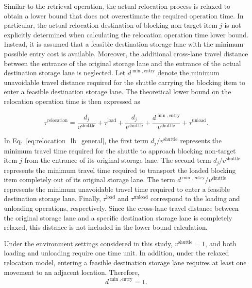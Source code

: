 Similar to the retrieval operation, the actual relocation process is relaxed to obtain a lower bound that does not overestimate the required operation time. In particular, the actual relocation destination of blocking non-target item \(j\) is not explicitly determined when calculating the relocation operation time lower bound. Instead, it is assumed that a feasible destination storage lane with the minimum possible entry cost is available. Moreover, the additional cross-lane travel distance between the entrance of the original storage lane and the entrance of the actual destination storage lane is neglected. Let \(d^{\min,\mathrm{entry}}\) denote the minimum unavoidable travel distance required for the shuttle carrying the blocking item to enter a feasible destination storage lane. The theoretical lower bound on the relocation operation time is then expressed as

\begin{equation}
\tau^{\mathrm{relocation}}
=
\frac{d_j}{v^{\mathrm{shuttle}}}
+
\tau^{\mathrm{load}}
+
\frac{d_j}{v^{\mathrm{shuttle}}}
+
\frac{d^{\min,\mathrm{entry}}}{v^{\mathrm{shuttle}}}
+
\tau^{\mathrm{unload}}.
\label{eq:relocation_lb_general}
\end{equation}

In Eq.~\eqref{eq:relocation_lb_general}, the first term \(d_j/v^{\mathrm{shuttle}}\) represents the minimum travel time required for the shuttle to approach blocking non-target item \(j\) from the entrance of its original storage lane. The second term \(d_j/v^{\mathrm{shuttle}}\) represents the minimum travel time required to transport the loaded blocking item completely out of its original storage lane. The term \(d^{\min,\mathrm{entry}}/v^{\mathrm{shuttle}}\) represents the minimum unavoidable travel time required to enter a feasible destination storage lane. Finally, \(\tau^{\mathrm{load}}\) and \(\tau^{\mathrm{unload}}\) correspond to the loading and unloading operations, respectively. Since the cross-lane travel distance between the original storage lane and a specific destination storage lane is completely relaxed, this distance is not included in the lower-bound calculation.

Under the environment settings considered in this study, \(v^{\mathrm{shuttle}}=1\), and both loading and unloading require one time unit. In addition, under the relaxed relocation model, entering a feasible destination storage lane requires at least one movement to an adjacent location. Therefore,
\[
d^{\min,\mathrm{entry}} = 1.
\]

